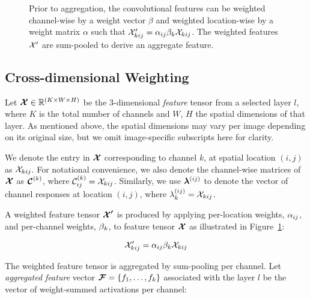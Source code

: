 \documentclass[runningheads]{llncs}
\begin{document}
\begin{figure}[t]

\caption{Prior to aggregation, the convolutional features can be weighted channel-wise by a weight vector $\beta$ and weighted location-wise by a weight matrix $\alpha$ such that $\mathcal{X}_{kij}^\prime = \alpha_{ij} \beta_{k} \mathcal{X}_{kij}$. The weighted features $\mathcal{X}^\prime$ are sum-pooled to derive an aggregate feature.}
\label{fig:feature_weighting}
\end{figure} 



\subsection{Cross-dimensional Weighting}

Let $\bm{\mathcal{X}} \in \mathbb{R}^{(K \times W \times H)}$ be the 3-dimensional \textit{feature} tensor from a selected layer $l$, where $K$ is the total number of channels and $W$, $H$ the spatial dimensions of that layer. As mentioned above, the spatial dimensions may vary per image depending on its original size, but we omit image-specific subscripts here for clarity. 


We denote the entry in $\bm{\mathcal{X}}$ corresponding to channel $k$, at spatial location $(i,j)$ as $\mathcal{X}_{kij}$. For notational convenience, we also denote the channel-wise matrices of $\bm{\mathcal{X}}$ as $\bm{\mathcal{C}}^{(k)}$, where $\mathcal{C}^{(k)}_{ij} = \mathcal{X}_{kij}$. Similarly, we use $\bm{\lambda}^{(ij)}$ to denote the vector of channel responses at location $(i,j)$, where $\lambda^{(ij)}_k = \mathcal{X}_{kij}$.

A weighted feature tensor $\bm{\mathcal{X}^\prime}$ is produced by applying per-location weights, $\alpha_{ij}$, and per-channel weights, $\beta_{k}$, to feature tensor $\bm{\mathcal{X}}$ as illustrated in Figure~\ref{fig:feature_weighting}:

\begin{equation}
\mathcal{X}_{kij}^\prime = \alpha_{ij} \beta_{k} \mathcal{X}_{kij}
\label{eqn:spatialweightsum}
\end{equation}


The weighted feature tensor is aggregated by sum-pooling per channel. Let \textit{aggregated feature} vector $\bm{\mathcal{F}} = \{f_1, \ldots, f_k\}$ associated with the layer $l$ be the vector of weight-summed activations per channel:
\end{document}
